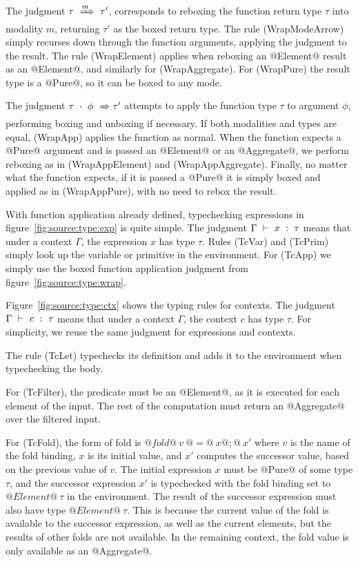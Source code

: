 The judgment $\tau ~\xRightarrow{m}~ \tau'$, corresponds to reboxing the function return type $\tau$ into modality $m$, returning $\tau'$ as the boxed return type.
The rule (WrapModeArrow) simply recurses down through the function arguments, applying the judgment to the result.
The rule (WrapElement) applies when reboxing an @Element@ result as an @Element@, and similarly for (WrapAggregate).
For (WrapPure) the result type is a @Pure@, so it can be boxed to any mode.

The judgment $\tau~\cdot~\phi ~\xRightarrow~ \tau'$ attempts to apply the function type $\tau$ to argument $\phi$, performing boxing and unboxing if necessary.
If both modalities and types are equal, (WrapApp) applies the function as normal.
When the function expects a @Pure@ argument and is passed an @Element@ or an @Aggregate@, we perform reboxing as in (WrapAppElement) and (WrapAppAggregate).
Finally, no matter what the function expects, if it is passed a @Pure@ it is simply boxed and applied as in (WrapAppPure), with no need to rebox the result.




With function application already defined, typechecking expressions in figure~\ref{fig:source:type:exp} is quite simple.
The judgment $\Gamma ~\vdash~ x ~:~ \tau$ means that under a context $\Gamma$, the expression $x$ has type $\tau$.
Rules (TcVar) and (TcPrim) simply look up the variable or primitive in the environment.
For (TcApp) we simply use the boxed function application judgment from figure~\ref{fig:source:type:wrap}.



Figure~\ref{fig:source:type:ctx} shows the typing rules for contexts.
The judgment $\Gamma ~\vdash~ c ~:~ \tau$ means that under a context $\Gamma$, the context $c$ has type $\tau$.
For simplicity, we reuse the same judgment for expressions and contexts.

The rule (TcLet) typechecks its definition and adds it to the environment when typechecking the body.

For (TcFilter), the predicate must be an @Element@, as it is executed for each element of the input.
The rest of the computation must return an @Aggregate@ over the filtered input.

For (TcFold), the form of fold is $@fold@~v~@=@~x@;@~x'$ where $v$ is the name of the fold binding, $x$ is its initial value, and $x'$ computes the successor value, based on the previous value of $v$.
The initial expression $x$ must be @Pure@ of some type $\tau$, and the successor expression $x'$ is typechecked with the fold binding set to $@Element@~\tau$ in the environment.
The result of the successor expression must also have type $@Element@~\tau$.
This is because the current value of the fold is available to the successor expression, as well as the current elements, but the results of other folds are not available.
In the remaining context, the fold value is only available as an @Aggregate@.

